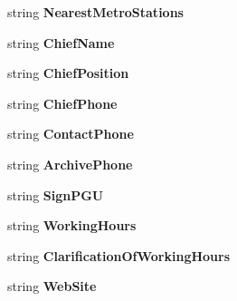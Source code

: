 \begin{DoxyCompactItemize}
\item 
string {\bfseries Nearest\+Metro\+Stations}\hspace{0.3cm}{\ttfamily  [get, set]}\label{classkdz__manager_1_1_map_data_row_a290d8b82d3925cd0435491be2782d7be}

\item 
string {\bfseries Chief\+Name}\hspace{0.3cm}{\ttfamily  [get, set]}\label{classkdz__manager_1_1_map_data_row_a2b949c4066c7da75ac75b9e4c43269d3}

\item 
string {\bfseries Chief\+Position}\hspace{0.3cm}{\ttfamily  [get, set]}\label{classkdz__manager_1_1_map_data_row_ab744770e144d24909e9ed3f50748843e}

\item 
string {\bfseries Chief\+Phone}\hspace{0.3cm}{\ttfamily  [get, set]}\label{classkdz__manager_1_1_map_data_row_a64ef3ef40186d005d587d77c70918067}

\item 
string {\bfseries Contact\+Phone}\hspace{0.3cm}{\ttfamily  [get, set]}\label{classkdz__manager_1_1_map_data_row_a60e6463566cb751d141d67d7984f3172}

\item 
string {\bfseries Archive\+Phone}\hspace{0.3cm}{\ttfamily  [get, set]}\label{classkdz__manager_1_1_map_data_row_ac0123ac2ba612e4e6639c3be12fa0b38}

\item 
string {\bfseries Sign\+P\+G\+U}\hspace{0.3cm}{\ttfamily  [get, set]}\label{classkdz__manager_1_1_map_data_row_a830f3a9d060596330cb0a05e16585d08}

\item 
string {\bfseries Working\+Hours}\hspace{0.3cm}{\ttfamily  [get, set]}\label{classkdz__manager_1_1_map_data_row_ae23dd44a8a4e9b18cff4494ecf4d03cc}

\item 
string {\bfseries Clarification\+Of\+Working\+Hours}\hspace{0.3cm}{\ttfamily  [get, set]}\label{classkdz__manager_1_1_map_data_row_a201b25d204d2985fae8cabbfa1dd2c6e}

\item 
string {\bfseries Web\+Site}\hspace{0.3cm}{\ttfamily  [get, set]}\label{classkdz__manager_1_1_map_data_row_adb0ed212a01483827640afd66235aa28}


\end{DoxyCompactItemize}

